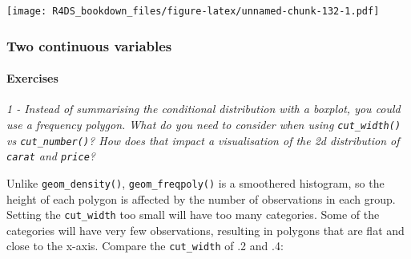 \documentclass[]{article}
\newenvironment{Shaded}{\begin{snugshade}}{\end{snugshade}}
\newcommand{\KeywordTok}[1]{\textcolor[rgb]{0.13,0.29,0.53}{\textbf{#1}}}
\newcommand{\DataTypeTok}[1]{\textcolor[rgb]{0.13,0.29,0.53}{#1}}
\newcommand{\DecValTok}[1]{\textcolor[rgb]{0.00,0.00,0.81}{#1}}
\newcommand{\StringTok}[1]{\textcolor[rgb]{0.31,0.60,0.02}{#1}}
\newcommand{\OperatorTok}[1]{\textcolor[rgb]{0.81,0.36,0.00}{\textbf{#1}}}
\newcommand{\NormalTok}[1]{#1}
\let\oldparagraph\paragraph
\renewcommand{\paragraph}[1]{\oldparagraph{#1}\mbox{}}
\theoremstyle{definition}
\theoremstyle{definition}
\theoremstyle{definition}
\theoremstyle{remark}
\begin{document}
\begin{Shaded}
\end{Shaded}

\texttt{[image: R4DS\_bookdown\_files/figure-latex/unnamed-chunk-132-1.pdf]}

\subsubsection{Two continuous variables}\label{two-continuous-variables}

\paragraph{Exercises}\label{exercises-17}

\emph{1 - Instead of summarising the conditional distribution with a
boxplot, you could use a frequency polygon. What do you need to consider
when using \texttt{cut\_width()} vs \texttt{cut\_number()}? How does
that impact a visualisation of the 2d distribution of \texttt{carat} and
\texttt{price}?}

Unlike \texttt{geom\_density()}, \texttt{geom\_freqpoly()} is a
smoothered histogram, so the height of each polygon is affected by the
number of observations in each group. Setting the \texttt{cut\_width}
too small will have too many categories. Some of the categories will
have very few observations, resulting in polygons that are flat and
close to the x-axis. Compare the \texttt{cut\_width} of .2 and .4:

\begin{Shaded}
\end{Shaded}
\end{document}
